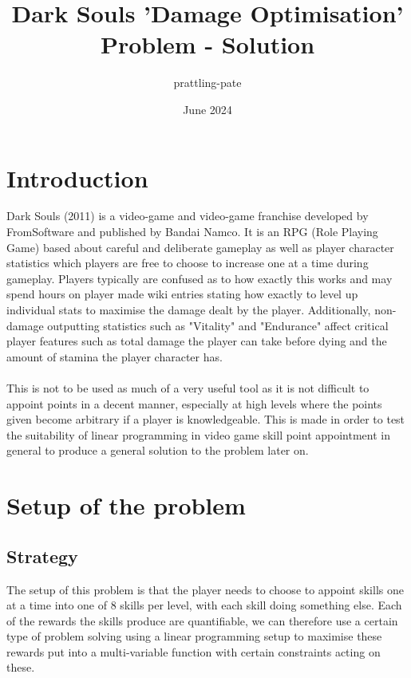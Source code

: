 \documentclass{article}
\title{Dark Souls 'Damage Optimisation' Problem - Solution}
\author{prattling-pate}
\date{June 2024}
\begin{document}
\maketitle

\tableofcontents

\section{Introduction}

Dark Souls (2011) is a video-game and video-game franchise developed by FromSoftware and published by Bandai Namco. It is an RPG (Role Playing Game) based about careful and deliberate gameplay as well as player character statistics which players are free to choose to increase one at a time during gameplay. Players typically are confused as to how exactly this works and may spend hours on player made wiki entries stating how exactly to level up individual stats to maximise the damage dealt by the player. Additionally, non-damage outputting statistics such as "Vitality" and "Endurance" affect critical player features such as total damage the player can take before dying and the amount of stamina the player character has.
\paragraph{}This is not to be used as much of a very useful tool as it is not difficult to appoint points in a decent manner, especially at high levels where the points given become arbitrary if a player is knowledgeable. This is made in order to test the suitability of linear programming in video game skill point appointment in general to produce a general solution to the problem later on.

\section{Setup of the problem}
\subsection{Strategy}
The setup of this problem is that the player needs to choose to appoint skills one at a time into one of 8 skills per level, with each skill doing something else. Each of the rewards the skills produce are quantifiable, we can therefore use a certain type of problem solving using a linear programming setup to maximise these rewards put into a multi-variable function with certain constraints acting on these.
\end{document}
